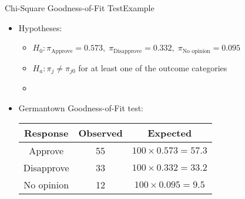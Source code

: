 \documentclass[xcolor=dvipsnames]{beamer}
\begin{document}
\begin{frame}{Chi-Square Goodness-of-Fit Test}{Example}
	\begin{itemize}
		\item Hypotheses:
		\begin{itemize}
			\item $H_0: \pi_{\text{Approve}} = 0.573,\; \pi_{\text{Disapprove}} = 0.332,\; \pi_{\text{No opinion}}=0.095$
			\item $H_a: \pi_j \neq \pi_{j0}$ for at least one of the outcome categories
			\item[]
		\end{itemize}
	\item Germantown Goodness-of-Fit test:
	\vspace{1mm}
	\begin{center}
		\begin{tabular}{ccc}
			\hline
			Response & Observed & Expected \\ \hline \hline
			Approve & 55 & $100 \times 0.573 = 57.3$\\
			Disapprove & 33 & $100 \times 0.332 = 33.2$ \\
			No opinion & 12 & $100 \times 0.095 = 9.5$ \\ \hline
		\end{tabular}
	\end{center}
	\end{itemize}
\end{frame}
\end{document}
